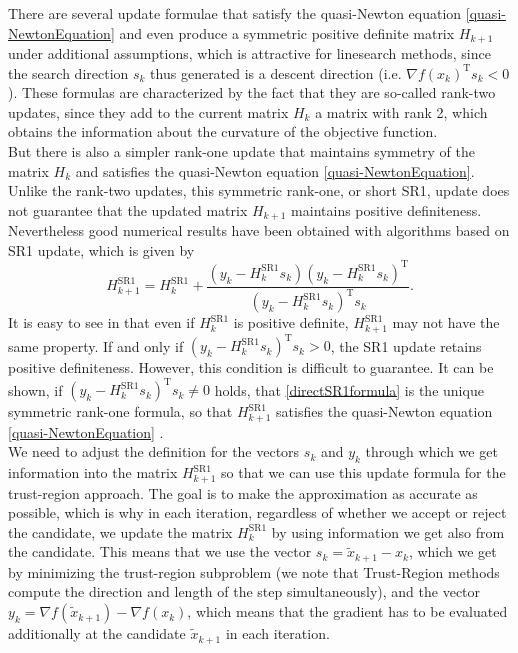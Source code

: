 There are several update formulae that satisfy the quasi-Newton equation \cref{quasi-NewtonEquation} and even produce a symmetric positive definite matrix $H_{k+1}$ under additional assumptions, which is attractive for linesearch methods, since the search direction $s_k$ thus generated is a descent direction (i.e. $\nabla f(x_k)^{\mathrm{T}} s_k < 0$). These formulas are characterized by the fact that they are so-called rank-two updates, since they add to the current matrix $H_k$ a matrix with rank 2, which obtains the information about the curvature of the objective function. \\
But there is also a simpler rank-one update that maintains symmetry of the matrix $H_k$ and satisfies the quasi-Newton equation \cref{quasi-NewtonEquation}. Unlike the rank-two updates, this symmetric rank-one, or short SR1, update does not guarantee that the updated matrix $H_{k+1}$ maintains positive definiteness. Nevertheless good numerical results have been obtained with algorithms based on SR1 update, which is given by
\begin{equation}\label{directSR1formula}
    H^\mathrm{SR1}_{k+1} = H^\mathrm{SR1}_k + \frac{(y_k - H^\mathrm{SR1}_k s_k) (y_k - H^\mathrm{SR1}_k s_k)^{\mathrm{T}}}{(y_k - H^\mathrm{SR1}_k s_k)^{\mathrm{T}} s_k}.
\end{equation}
It is easy to see in that even if $H^\mathrm{SR1}_k$ is positive definite, $H^\mathrm{SR1}_{k+1}$ may not have the same property. If and only if $(y_k - H^\mathrm{SR1}_k s_k)^{\mathrm{T}} s_k > 0$, the SR1 update retains positive definiteness. However, this condition is difficult to guarantee. It can be shown, if $(y_k - H^\mathrm{SR1}_k s_k)^{\mathrm{T}} s_k \neq 0$ holds, that \cref{directSR1formula} is the unique symmetric rank-one formula, so that $H^\mathrm{SR1}_{k+1}$ satisfies the quasi-Newton equation \cref{quasi-NewtonEquation} \cite[p.~144-145]{NocedalWright:2006}. \\

We need to adjust the definition for the vectors $s_k$ and $y_k$ through which we get information into the matrix $H^\mathrm{SR1}_{k+1}$ so that we can use this update formula for the trust-region approach. The goal is to make the approximation as accurate as possible, which is why in each iteration, regardless of whether we accept or reject the candidate, we update the matrix $H^\mathrm{SR1}_k$ by using information we get also from the candidate. This means that we use the vector $s_k = \widetilde{x}_{k+1} - x_k$, which we get by minimizing the trust-region subproblem (we note that Trust-Region methods compute the direction and length of the step simultaneously), and the vector $y_k = \nabla f(\widetilde{x}_{k+1}) - \nabla f(x_k)$, which means that the gradient has to be evaluated additionally at the candidate $\widetilde{x}_{k+1}$ in each iteration. \\

